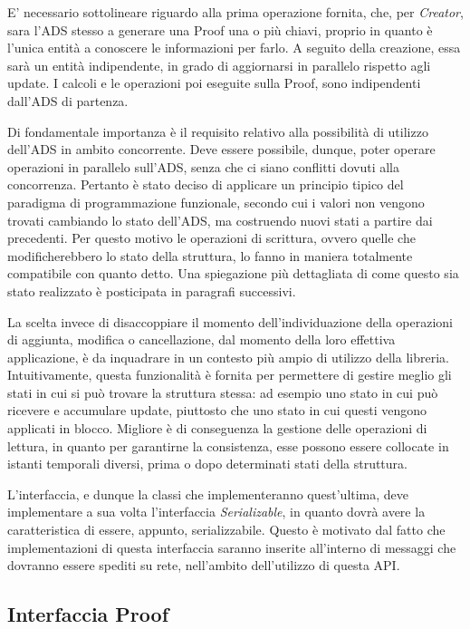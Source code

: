 		E' necessario sottolineare riguardo alla prima operazione fornita, che, per \textit{Creator}, sara l'ADS stesso a generare una Proof una o più chiavi, proprio in quanto è l'unica entità a conoscere le informazioni per farlo. A seguito della creazione, essa sarà un entità indipendente, in grado di aggiornarsi in parallelo rispetto agli update. I calcoli e le operazioni poi eseguite sulla Proof, sono indipendenti dall'ADS di partenza.
		
		Di fondamentale importanza è il requisito relativo alla possibilità di utilizzo dell'ADS in ambito concorrente. Deve essere possibile, dunque, poter operare operazioni in parallelo sull'ADS, senza che ci siano conflitti dovuti alla concorrenza. Pertanto è stato deciso di applicare un principio tipico del paradigma di programmazione funzionale, secondo cui i valori non vengono trovati cambiando lo stato dell'ADS, ma costruendo nuovi stati a partire dai precedenti. Per questo motivo le operazioni di scrittura, ovvero quelle che modificherebbero lo stato della struttura, lo fanno in maniera totalmente compatibile con quanto detto. Una spiegazione più dettagliata di come questo sia stato realizzato è posticipata in paragrafi successivi.
		
		La scelta invece di disaccoppiare il momento dell'individuazione della operazioni di aggiunta, modifica o cancellazione, dal momento della loro effettiva applicazione, è da inquadrare in un contesto più ampio di utilizzo della libreria. Intuitivamente, questa funzionalità è fornita per permettere di gestire meglio gli stati in cui si può trovare la struttura stessa: ad esempio uno stato in cui può ricevere e accumulare update, piuttosto che uno stato in cui questi vengono applicati in blocco. Migliore è di conseguenza la gestione delle operazioni di lettura, in quanto per garantirne la consistenza, esse possono essere collocate in istanti temporali diversi, prima o dopo determinati stati della struttura.
		
		L'interfaccia, e dunque la classi che implementeranno quest'ultima, deve implementare a sua volta l'interfaccia \textit{Serializable}, in quanto dovrà avere la caratteristica di essere, appunto, serializzabile. Questo è motivato dal fatto che implementazioni di questa interfaccia saranno inserite all'interno di messaggi che dovranno essere spediti su rete, nell'ambito dell'utilizzo di questa API.
	
	\subsection{Interfaccia Proof}
	
